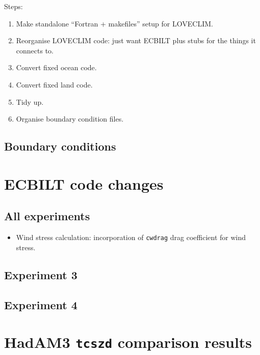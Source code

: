 \documentclass[a4paper,11pt]{article}
\begin{document}
Steps:
\begin{enumerate}
  \item{Make standalone ``Fortran + makefiles'' setup for LOVECLIM.}
  \item{Reorganise LOVECLIM code: just want ECBILT plus stubs for the
    things it connects to.}
  \item{Convert fixed ocean code.}
  \item{Convert fixed land code.}
  \item{Tidy up.}
  \item{Organise boundary condition files.}
\end{enumerate}

\subsection{Boundary conditions}


\appendix
\section{ECBILT code changes}

\subsection*{All experiments}

\begin{itemize}
  \item{Wind stress calculation: incorporation of \texttt{cwdrag} drag
    coefficient for wind stress.}
\end{itemize}

\subsection*{Experiment 3}


\subsection*{Experiment 4}


\section{HadAM3 \texttt{tcszd} comparison results}
\label{sec:hadam3}
\end{document}
